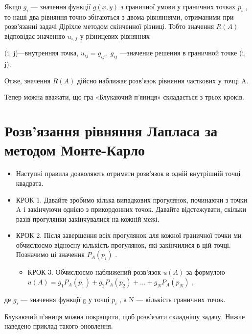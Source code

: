 \documentclass[
  ukrainian,
]{article}
\providecommand{\tightlist}{%
  \setlength{\itemsep}{0pt}\setlength{\parskip}{0pt}}
\begin{document}
Якщо \(g_i\) --- значення функції \(g(x, y)\) з граничної умови у
граничних точках \(p_i\) , то наші два рівняння точно збігаються з двома
рівняннями, отриманими при розв'язанні задачі Діріхле методом скінченної
різниці. Тобто значення \(R(A)\) відповідає значенню \(u_{i,f}\) у
різницевих рівняннях

(i, j)---внутренняя точка, \(u_{ij} = g_{ij},\) \(g_{ij}\) ---значение
решения в граничной точке (i, j).

Отже, значення \(R(A)\) дійсно наближає розв'язок рівняння часткових у
точці A.

Тепер можна вважати, що гра «Блукаючий п'яниця» складається з трьох
кроків.

\section{Розв'язання рівняння Лапласа за методом
Монте-Карло}\label{ux440ux43eux437ux432ux44fux437ux430ux43dux43dux44f-ux440ux456ux432ux43dux44fux43dux43dux44f-ux43bux430ux43fux43bux430ux441ux430-ux437ux430-ux43cux435ux442ux43eux434ux43eux43c-ux43cux43eux43dux442ux435-ux43aux430ux440ux43bux43e}

\begin{itemize}
\tightlist
\item
  Наступні правила дозволяють отримати розв'язок в одній внутрішній
  точці квадрата.
\item
  КРОК 1. Давайте зробимо кілька випадкових прогулянок, починаючи з
  точки A і закінчуючи однією з прикордонних точок. Давайте
  відстежувати, скільки разів прогулянки закінчувалися на кожній межі.
\item
  КРОК 2. Після завершення всіх прогулянок для кожної граничної точки ми
  обчислюємо відносну кількість прогулянок, які закінчилися в цій точці.
  Позначимо ці значення \(P_A(p_i)\) .

  \begin{itemize}
  \tightlist
  \item
    КРОК 3. Обчислюємо наближений розв'язок \(u(A)\) за формулою
    \(u(A) = g_1 P_A(p_1) + g_2 P_A(p_2) + \dots + g_N P_A(p_N)\) ,
  \end{itemize}
\end{itemize}

де \(g_i\) --- значення функції g у точці \(p_i\) , а N --- кількість
граничних точок.

Блукаючий п'яниця можна покращити, щоб розв'язати складнішу задачу.
Нижче наведено приклад такого оновлення.
\end{document}
